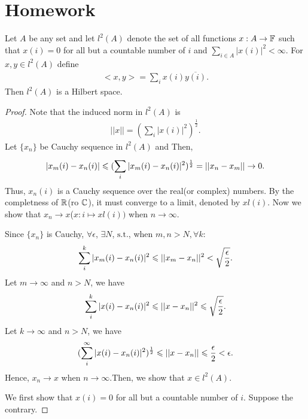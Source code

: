 \section{Homework}
\begin{exercise}{}{}
    Let $A$ be any set and let $l^2(A)$ denote the set of all functions $x:A\rightarrow \mathbb{F}$ such that $x(i)=0$ for all but a countable number of $i$ and 
    $\sum\limits_{i\in A}|x(i)|^2<\infty$. For $x,y\in l^2(A)$ define
    \begin{align*}
        <x,y> = \sum\limits_{i}^{}x(i)\overline{y(i)}.
    \end{align*}
    Then $l^2(A)$ is a Hilbert space.
\end{exercise}
\begin{proof}
    Note that the induced norm in $l^2(A)$ is
    \begin{align*}
        ||x|| = (\sum\limits_{i}^{}{|x(i)|}^{2})^{\frac{1}{2}}.
    \end{align*}
    Let $\{x_n\}$ be Cauchy sequence in $l^2(A)$ and 
    Then, 
    \begin{align*}
        |x_m(i)-x_n(i)|\leqslant (\sum\limits_{i}^{}|x_m(i)-x_n(i)|^2)^{\frac{1}{2}}=||x_n-x_m||\rightarrow 0.
    \end{align*}
    Thus, $x_n(i)$ is a Cauchy sequence over the real(or complex) numbers. By the completness of $\mathbb{R}$(ro $\mathbb{C}$), it must converge to a limit, denoted by $xl(i)$.
    Now we show that $x_n\rightarrow x$($x:i\mapsto xl(i))$ when $n\rightarrow \infty$. 
    \par
    Since $\{x_n\}$ is Cauchy, $\forall \epsilon$, $\exists N$, $\mathrm{s.t.}$, when $m,n>N, \forall k: $
    \begin{align*}
        \sum\limits_{i}^{k}|x_m(i)-x_n(i)|^2\leqslant ||x_m-x_n||^2<\sqrt{\frac{\epsilon}{2}}.
    \end{align*} 
    Let $m\rightarrow \infty$ and $n>N$, we have
    \begin{align*}
        \sum\limits_{i}^{k}|x(i)-x_n(i)|^2\leqslant ||x-x_n||^2\leqslant\sqrt{\frac{\epsilon}{2}}.
    \end{align*}
    Let $k\rightarrow \infty$ and $n>N$, we have
    \begin{align*}
        (\sum\limits_{i}^{\infty}|x(i)-x_n(i)|^2)^{\frac{1}{2}}\leqslant ||x-x_n||\leqslant\frac{\epsilon}{2}<\epsilon.
    \end{align*}
    Hence, $x_n\rightarrow x$ when $n\rightarrow \infty$.Then, we show that $x\in l^2(A)$. 
    \par
    We first show that $x(i)=0$ for all but a countable number of $i$. Suppose the contrary. 

\end{proof}
